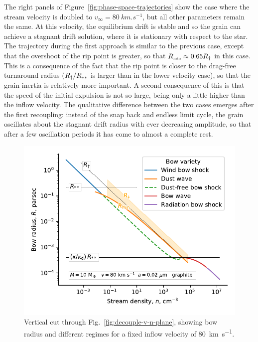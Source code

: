 The right panels of Figure~\ref{fig:phase-space-trajectories} show the
case where the stream velocity is doubled to
\(v_\infty = \SI{80}{km.s^{-1}}\), but all other parameters remain the
same.  At this velocity, the equilibrium drift is stable and so the
grain can achieve a stagnant drift solution, where it is stationary
with respect to the star.  The trajectory during the first approach is
similar to the previous case, except that the overshoot of the rip
point is greater, so that \(R_{\scriptscriptstyle\text{min}} \approx 0.65 R_\dag\) in this case.  This is
a consequence of the fact that the rip point is closer to the
drag-free turnaround radius (\(R_\dag / R_{**}\) is larger than in
the lower velocity case), so that the grain inertia is relatively more
important.  A second consequence of this is that the speed of the
initial expulsion is not so large, being only a little higher than the
inflow velocity.  The qualitative difference between the two cases
emerges after the first recoupling: instead of the snap back and
endless limit cycle, the grain oscillates about the stagnant drift
radius with ever decreasing amplitude, so that after a few oscillation
periods it has come to almost a complete rest.

\begin{figure}
  \includegraphics[width=\linewidth]{figs/onaxis-stats-plot-MS10-v080-gra002}
  \caption{Vertical cut through Fig.~\ref{fig:decouple-v-n-plane},
    showing bow radius and different regimes for a fixed inflow
    velocity of \SI{80}{km.s^{-1}}.}
  \label{fig:decouple-vertical-cut}
\end{figure}

